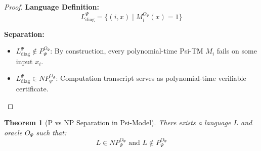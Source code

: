 \documentclass[11pt]{article}
\newtheorem{theorem}{Theorem}
\begin{document}
\begin{proof}
\textbf{Language Definition:}
$$L_{\text{diag}}^\Psi = \{(i, x) \mid M_i^{O_\Psi}(x) = 1\}$$

\textbf{Separation:}
\begin{itemize}
\item $L_{\text{diag}}^\Psi \notin P^{O_\Psi}_\Psi$: By construction, every polynomial-time Psi-TM $M_i$ fails on some input $x_i$.
\item $L_{\text{diag}}^\Psi \in NP^{O_\Psi}_\Psi$: Computation transcript serves as polynomial-time verifiable certificate.
\end{itemize}
\end{proof}

\begin{theorem}[P vs NP Separation in Psi-Model]
\label{thm:separation}
There exists a language $L$ and oracle $O_\Psi$ such that:
$$L \in NP^{O_\Psi}_\Psi \text{ and } L \notin P^{O_\Psi}_\Psi$$
\end{theorem}
\end{document}
